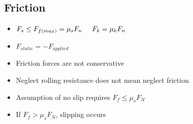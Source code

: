 \documentclass [10pt] {article}
\begin{document}
\begin{multicols*}{2}
\section{Friction}
	\begin{itemize}
		\item $F_s \leq F_{f(max)} = \mu_s F_n \hspace{5mm} F_k = \mu_k F_n $
		\item $F_{static} = -F_{applied}$
		\item Friction forces are not conservative 
		\item Neglect rolling resistance does not mean neglect friction 
		\item Assumption of no slip requires $F_f \leq \mu_sF_N $
		\item If $F_f > \mu_sF_N$, slipping occurs
	\end{itemize}

\end{multicols*}
\end{document}
